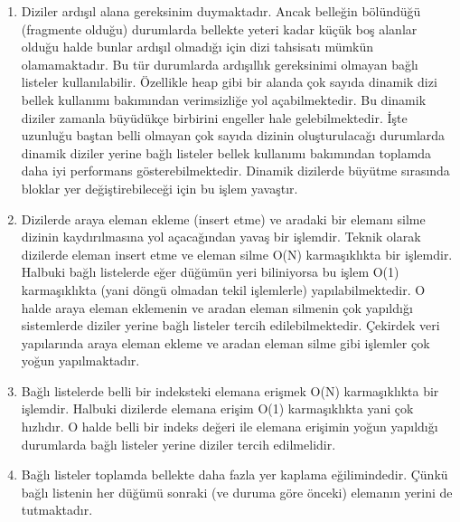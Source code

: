 \documentclass[a4paper,10pt,turkish]{sphinxmanual}
\begin{document}
\begin{enumerate}
%
\item {} 
\sphinxAtStartPar
{} Diziler ardışıl alana gereksinim duymaktadır. Ancak belleğin
bölündüğü (fragmente olduğu) durumlarda bellekte yeteri kadar küçük boş alanlar olduğu halde bunlar
ardışıl olmadığı için dizi tahsisatı mümkün olamamaktadır. Bu tür durumlarda ardışıllık gereksinimi
olmayan bağlı listeler kullanılabilir. Özellikle heap gibi bir alanda çok sayıda dinamik dizi bellek
kullanımı bakımından verimsizliğe yol açabilmektedir. Bu dinamik diziler zamanla büyüdükçe birbirini
engeller hale gelebilmektedir. İşte uzunluğu baştan belli olmayan çok sayıda dizinin oluşturulacağı
durumlarda dinamik diziler yerine bağlı listeler bellek kullanımı bakımından toplamda daha iyi
performans gösterebilmektedir. Dinamik dizilerde büyütme sırasında bloklar yer değiştirebileceği için
bu işlem yavaştır.

\item {} 
\sphinxAtStartPar
{} Dizilerde araya eleman ekleme (insert etme) ve aradaki bir
elemanı silme dizinin kaydırılmasına yol açacağından yavaş bir işlemdir. Teknik olarak dizilerde eleman
insert etme ve eleman silme O(N) karmaşıklıkta bir işlemdir. Halbuki bağlı listelerde eğer düğümün yeri
biliniyorsa bu işlem O(1) karmaşıklıkta (yani döngü olmadan tekil işlemlerle) yapılabilmektedir. O halde
araya eleman eklemenin ve aradan eleman silmenin çok yapıldığı sistemlerde diziler yerine bağlı listeler
tercih edilebilmektedir. Çekirdek veri yapılarında araya eleman ekleme ve aradan eleman silme gibi
işlemler çok yoğun yapılmaktadır.

\item {} 
\sphinxAtStartPar
{} Bağlı listelerde belli bir indeksteki elemana erişmek O(N) karmaşıklıkta
bir işlemdir. Halbuki dizilerde elemana erişim O(1) karmaşıklıkta yani çok hızlıdır. O halde belli bir
indeks değeri ile elemana erişimin yoğun yapıldığı durumlarda bağlı listeler yerine diziler tercih
edilmelidir.

\item {} 
\sphinxAtStartPar
{} Bağlı listeler toplamda bellekte daha fazla yer kaplama eğilimindedir. Çünkü
bağlı listenin her düğümü sonraki (ve duruma göre önceki) elemanın yerini de tutmaktadır.

\end{enumerate}
\end{document}
